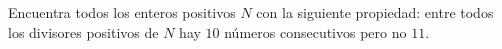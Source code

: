 Encuentra todos los enteros positivos $N$ con la siguiente propiedad: entre todos los divisores positivos de $N$ hay $10$ números consecutivos pero no $11$.